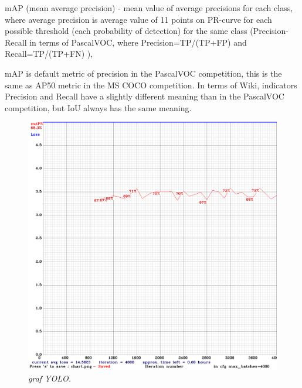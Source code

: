mAP (mean average precision) - mean value of average precisions for each class, where average precision is average value of 11 points on PR-curve for each possible threshold (each probability of detection) for the same class (Precision-Recall in terms of PascalVOC, where Precision=TP/(TP+FP) and Recall=TP/(TP+FN) ), %

mAP is default metric of precision in the PascalVOC competition, this is the same as AP50 metric in the MS COCO competition. In terms of Wiki, indicators Precision and Recall have a slightly different meaning than in the PascalVOC competition, but IoU always has the same meaning.

\begin{figure}[h!]
\begin{center} 
\includegraphics[scale=0.35]{figures/chart_yolo-obj.png}
\caption{\small \sl graf YOLO. \label{fig:chart_yolo}}
\end{center}
\end{figure}